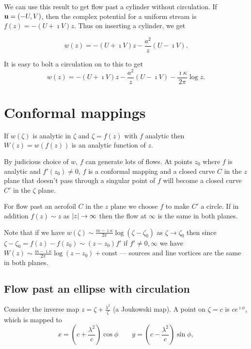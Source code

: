 \documentclass{notes}
\theoremstyle{plain}
\begin{document}
We can use this result to get flow past a cylinder without circulation.
If $\mathbf{u} = (-U,V)$, then the complex potential for a uniform stream
is $f(z) = - (U + \imath V) z$.  Thus on inserting a cylinder, we get

\begin{equation}\label{eq:cylnocirc}
w(z) = -\left(U + \imath V\right) z - \frac{a^2}{z} \left(U - \imath V\right).
\end{equation}

It is easy to bolt a circulation on to this to get
\begin{equation}\label{eq:cylcirc}
w(z) = -\left(U + \imath V\right) z - \frac{a^2}{z} \left(U - \imath V\right)
- \frac{\imath \kappa}{2 \pi} \log z.
\end{equation}

\section{Conformal mappings}

If $w(\zeta)$ is analytic in $\zeta$ and $\zeta = f(z)$ with $f$ analytic
then $W(z) = w(f(z))$ is an analytic function of $z$.

By judicious choice of $w$, $f$ can generate lots of flows.  At points
$z_0$ where $f$ is analytic and $f'(z_0) \neq 0$, $f$ is a conformal
mapping and a closed curve $C$ in the $z$ plane that doesn't pass through
a singular point of $f$ will become a closed curve $C'$ in the
$\zeta$ plane.

For flow past an aerofoil $C$ in the $z$ plane we choose $f$ to
make $C'$ a circle.  If in addition $f(z) \sim z$ as $\left|z\right| \to \infty$
then the flow at $\infty$ is the same in both planes.

Note that if we have $w(\zeta) \sim \frac{m - \imath \kappa}{2 \pi}
\log \left(\zeta - \zeta_0\right)$ as $\zeta \to \zeta_0$ then since
$\zeta - \zeta_0 = f(z) - f(z_0) \sim (z-z_0) f'$ if $f' \neq 0, \infty$
we have $W(z) \sim \frac{m - \imath \kappa}{2 \pi} \log \left(z - z_0\right) +
\text{const}$ --- sources and line vortices are the same in both planes.

\subsection{Flow past an ellipse with circulation}

\vspace{1in}

Consider the inverse map $z = \zeta + \frac{\lambda^2}{\zeta}$ (a
Joukowski map).  A point on $\zeta = c$ is $c e^{\imath \phi}$, which
is mapped to
\[
x = \left( c + \frac{\lambda^2}{c} \right) \cos \phi
\qquad y = \left( c - \frac{\lambda^2}{c} \right) \sin \phi,
\]
\end{document}
